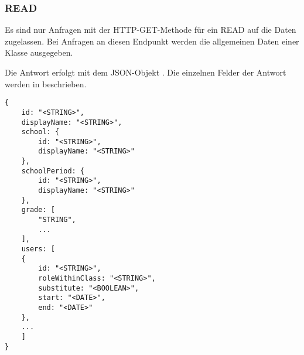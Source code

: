 \subsubsection{READ}
\label{sec:rest:api:classes:id:read}
Es sind nur Anfragen mit der HTTP-GET-Methode für ein READ auf die Daten zugelassen.
Bei Anfragen an diesen Endpunkt werden die allgemeinen Daten einer Klasse ausgegeben.

Die Antwort erfolgt mit dem JSON-Objekt . 
Die einzelnen Felder der Antwort werden in  beschrieben.

\begin{lstlisting}[caption={JSON-Antwort für einen GET-Aufruf des Pfads /api/classes/\$id},label={lst:code:rest:api:classes:id:read:ret},frame=tlrb]
{
    id: "<STRING>",
    displayName: "<STRING>",
    school: {
        id: "<STRING>",
        displayName: "<STRING>"
    },
    schoolPeriod: {
        id: "<STRING>",
        displayName: "<STRING>"
    },
    grade: [
        "STRING",
        ...
    ],
    users: [
    {
        id: "<STRING>",
        roleWithinClass: "<STRING>",
        substitute: "<BOOLEAN>",
        start: "<DATE>",
        end: "<DATE>"    
    },
    ...
    ]
}
\end{lstlisting}

